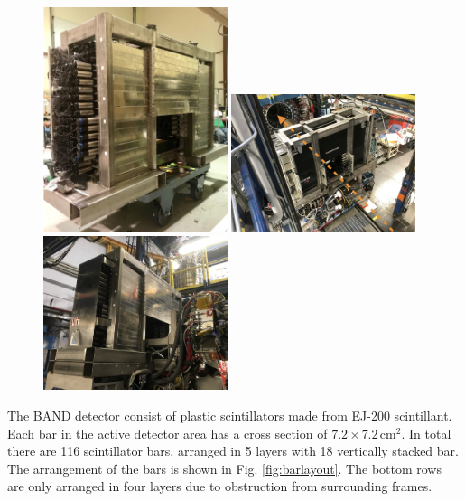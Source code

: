 \documentclass[review]{elsarticle}
\begin{document}
\begin{itemize}
\begin{figure}[thb]
\centering
\includegraphics[width=0.48\textwidth]{band_pre.png}
\includegraphics[width=0.48\textwidth]{band_hall1.png}
\includegraphics[width=0.48\textwidth]{band_hall2.png}
  \label{fig:bandcontext}
\end{figure}

The BAND detector consist of plastic scintillators made from  EJ-200 scintillant. Each bar in the active detector area has a cross section of $7.2 \times 7.2\,\mathrm{cm}^{2}$. In total there are 116 scintillator bars, arranged in 5 layers with 18 vertically stacked bar. The arrangement of the bars is shown in Fig. \ref{fig:barlayout}. The bottom rows are only arranged in four layers due to obstruction from surrounding frames.


\end{itemize}
\end{document}
